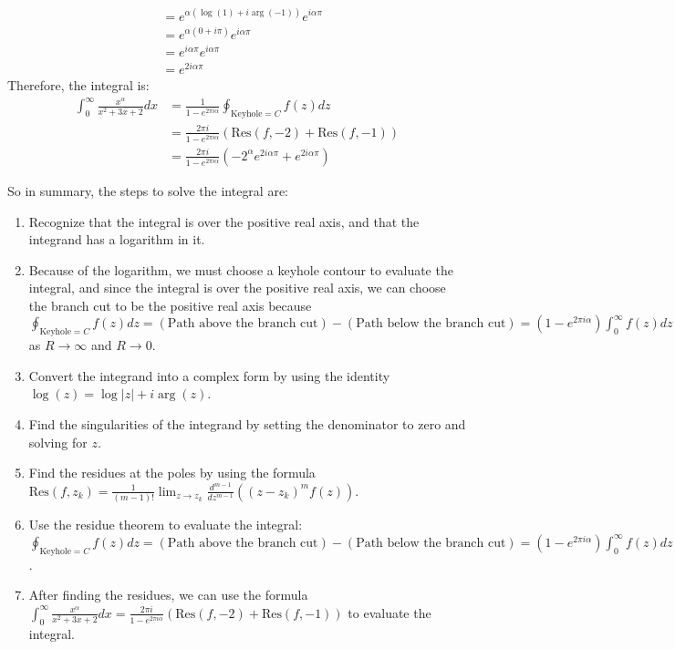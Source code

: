 \begin{example}
\begin{align*}
                           & = e^{\alpha (\log(1) + i\arg(-1))} e^{i\alpha\pi}                                \\
                           & = e^{\alpha (0 + i\pi)} e^{i\alpha\pi}                                           \\
                           & = e^{i\alpha\pi} e^{i\alpha\pi}                                                  \\
                           & = e^{2i\alpha\pi}
    \end{align*}
    Therefore, the integral is:
    \begin{align*}
        \int_0^\infty\frac{x^\alpha}{x^2+3x+2}dx & = \frac{1}{1 - e^{2\pi i \alpha}}\oint_{\text{Keyhole} = C} f(z)dz                 \\
                                                 & = \frac{2\pi i}{1 - e^{2\pi i \alpha}}(\text{Res}(f, -2) + \text{Res}(f, -1))      \\
                                                 & = \frac{2\pi i}{1 - e^{2\pi i \alpha}}(-2^\alpha e^{2i\alpha\pi} +e^{2i\alpha\pi})
    \end{align*}

    So in summary, the steps to solve the integral are:
    \begin{enumerate}
        \item Recognize that the integral is over the positive real axis, and that the integrand has a logarithm in it.
        \item Because of the logarithm, we must choose a keyhole contour to evaluate the integral, and since the integral is over the positive real axis, we can choose the branch cut to be the positive real axis because $\oint_{\text{Keyhole} = C} f(z)dz = (\text{Path above the branch cut}) - (\text{Path below the branch cut}) = (1 - e^{2\pi i \alpha})\int_0^\infty f(z)dz$ as $R \rightarrow \infty$ and $R \rightarrow 0$.
        \item Convert the integrand into a complex form by using the identity $\log(z) = \log|z| + i\arg(z)$.
        \item Find the singularities of the integrand by setting the denominator to zero and solving for $z$.
        \item Find the residues at the poles by using the formula $\text{Res}(f, z_k) = \frac{1}{(m - 1)!}\lim_{z \to z_k} \frac{d^{m-1}}{dz^{m-1}} ((z - z_k)^m f(z))$.
        \item Use the residue theorem to evaluate the integral: $\oint_{\text{Keyhole} = C} f(z)dz = (\text{Path above the branch cut}) - (\text{Path below the branch cut}) = (1 - e^{2\pi i \alpha})\int_0^\infty f(z)dz$.
        \item After finding the residues, we can use the formula $\int_0^\infty\frac{x^\alpha}{x^2+3x+2}dx = \frac{2\pi i}{1 - e^{2\pi i \alpha}}(\text{Res}(f, -2) + \text{Res}(f, -1))$ to evaluate the integral.
    \end{enumerate}
\end{example}

